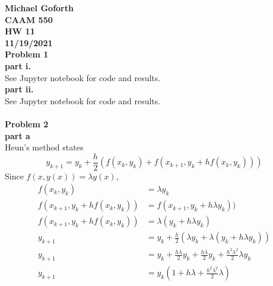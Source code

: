 \documentclass{article} %
\begin{document}
\textbf{Michael Goforth} \\
\textbf{CAAM 550} \\
\textbf{HW 11} \\
\textbf{11/19/2021} \\ 

\textbf{Problem 1} \\
\textbf{part i.} \\
See Jupyter notebook for code and results. 
\\

\textbf{part ii.} \\
See Jupyter notebook for code and results. \\
\\


\textbf{Problem 2} \\
\textbf{part a} \\
Heun's method states
\begin{equation*}
y_{k+1} = y_k + \frac{h}{2}(f(x_k, y_k) + f(x_{k+1}, y_k+hf(x_k, y_k)))
\end{equation*}
Since $f(x, y(x)) = \lambda y(x)$, 
\begin{align*}
f(x_k, y_k) &= \lambda y_k \\
f(x_{k+1}, y_k+hf(x_k, y_k)) &= f(x_{k+1}, y_k + h\lambda y_k)) \\
f(x_{k+1}, y_k+hf(x_k, y_k)) &= \lambda (y_k + h\lambda y_k) \\
y_{k+1} &= y_k + \frac{h}{2}(\lambda y_k + \lambda (y_k + h\lambda y_k)) \\
y_{k+1} &= y_k + \frac{h\lambda}{2}y_k + \frac{h\lambda}{2}y_k + \frac{h^2\lambda^2}{2}\lambda y_k \\
y_{k+1} &= y_k(1 + h\lambda + \frac{h^2\lambda^2}{2}\lambda)
\end{align*}
\\
\end{document}
